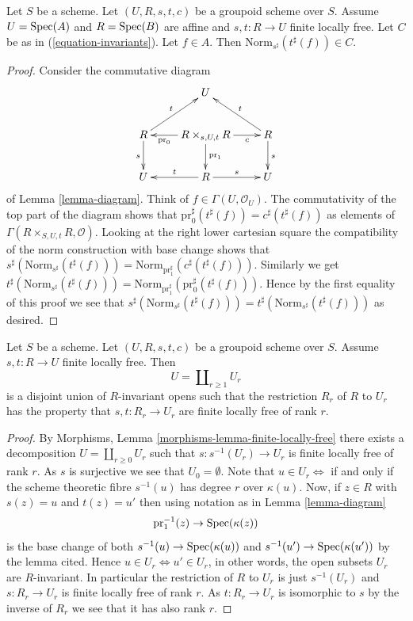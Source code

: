\begin{lemma}
\label{lemma-determinant-trick}
Let $S$ be a scheme. Let $(U, R, s, t, c)$ be a groupoid scheme over $S$.
Assume $U = \mathop{\mathrm{Spec}}(A)$ and $R = \mathop{\mathrm{Spec}}(B)$ are affine and
$s, t : R \to U$ finite locally free.
Let $C$ be as in (\ref{equation-invariants}).
Let $f \in A$. Then $\text{Norm}_{s^\sharp}(t^\sharp(f)) \in C$.
\end{lemma}

\begin{proof}
Consider the commutative diagram
$$
\xymatrix{
& U & \\
R \ar[d]_s \ar[ru]^t &
R \times_{s, U, t} R
\ar[l]^-{\text{pr}_0} \ar[d]^{\text{pr}_1} \ar[r]_-c &
R \ar[d]^s \ar[lu]_t \\
U & R \ar[l]_t \ar[r]^s & U
}
$$
of Lemma \ref{lemma-diagram}.
Think of $f \in \Gamma(U, \mathcal{O}_U)$. The commutativity of the
top part of the diagram shows that
$\text{pr}_0^\sharp(t^\sharp(f)) = c^\sharp(t^\sharp(f))$ as elements of
$\Gamma(R \times_{S, U, t} R, \mathcal{O})$.
Looking at the right lower cartesian square
the compatibility of the norm construction with base change shows that
$s^\sharp(\text{Norm}_{s^\sharp}(t^\sharp(f))) =
\text{Norm}_{\text{pr}_1^\sharp}(c^\sharp(t^\sharp(f)))$.
Similarly we get
$t^\sharp(\text{Norm}_{s^\sharp}(t^\sharp(f))) =
\text{Norm}_{\text{pr}_1^\sharp}(\text{pr}_0^\sharp(t^\sharp(f)))$.
Hence by the first equality of this proof we see that
$s^\sharp(\text{Norm}_{s^\sharp}(t^\sharp(f))) =
t^\sharp(\text{Norm}_{s^\sharp}(t^\sharp(f)))$ as desired.
\end{proof}

\begin{lemma}
\label{lemma-finite-locally-free-disjoint-free}
Let $S$ be a scheme. Let $(U, R, s, t, c)$ be a groupoid scheme over $S$.
Assume $s, t : R \to U$ finite locally free.
Then
$$
U = \coprod\nolimits_{r \geq 1} U_r
$$
is a disjoint union of $R$-invariant opens such that the restriction $R_r$ of
$R$ to $U_r$ has the property that $s, t : R_r \to U_r$ are finite locally
free of rank $r$.
\end{lemma}

\begin{proof}
By
Morphisms, Lemma \ref{morphisms-lemma-finite-locally-free}
there exists a decomposition
$U = \coprod\nolimits_{r \geq 0} U_r$
such that $s : s^{-1}(U_r) \to U_r$ is finite locally free of rank $r$.
As $s$ is surjective we see that $U_0 = \emptyset$.
Note that $u \in U_r \Leftrightarrow$ if and only if the scheme theoretic fibre
$s^{-1}(u)$ has degree $r$ over $\kappa(u)$. Now, if $z \in R$ with $s(z) = u$
and $t(z) = u'$ then using notation as in Lemma \ref{lemma-diagram}
$$
\text{pr}_1^{-1}(z) \to \mathop{\mathrm{Spec}}(\kappa(z))
$$
is the base change of both
$s^{-1}(u) \to \mathop{\mathrm{Spec}}(\kappa(u))$ and $s^{-1}(u') \to \mathop{\mathrm{Spec}}(\kappa(u'))$
by the lemma cited. Hence $u \in U_r \Leftrightarrow u' \in U_r$,
in other words, the open subsets $U_r$ are $R$-invariant.
In particular the restriction of $R$ to $U_r$ is just
$s^{-1}(U_r)$ and $s : R_r \to U_r$ is finite locally free of rank $r$.
As $t : R_r \to U_r$ is isomorphic to $s$ by the inverse of $R_r$
we see that it has also rank $r$.
\end{proof}

